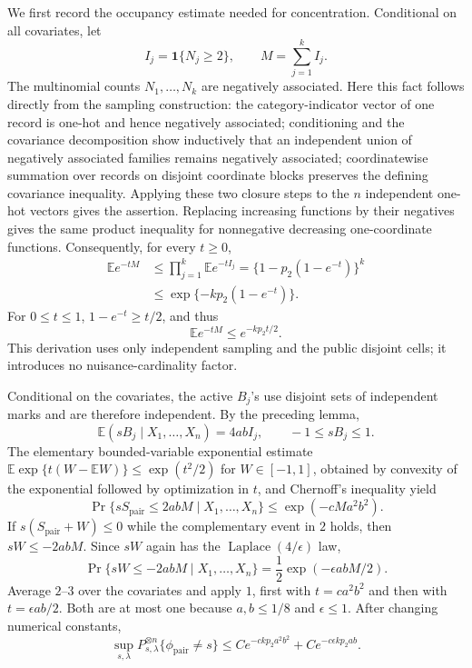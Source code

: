 We first record the occupancy estimate needed for concentration.  Conditional on all covariates, let
\[
 I_j=\mathbf1\{N_j\ge2\},
 \qquad M=\sum_{j=1}^k I_j.
\]
The multinomial counts \(N_1,\ldots,N_k\) are negatively associated.  Here this fact follows directly from the sampling construction: the category-indicator vector of one record is one-hot and hence negatively associated; conditioning and the covariance decomposition show inductively that an independent union of negatively associated families remains negatively associated; coordinatewise summation over records on disjoint coordinate blocks preserves the defining covariance inequality.  Applying these two closure steps to the \(n\) independent one-hot vectors gives the assertion.  Replacing increasing functions by their negatives gives the same product inequality for nonnegative decreasing one-coordinate functions.  Consequently, for every \(t\ge0\),
\[
 \begin{aligned}
 \mathbb E e^{-tM}
 &\le\prod_{j=1}^k\mathbb E e^{-tI_j}
   =\{1-p_2(1-e^{-t})\}^k\\
 &\le\exp\{-kp_2(1-e^{-t})\}.
 \end{aligned}
\]
For \(0\le t\le1\), \(1-e^{-t}\ge t/2\), and thus
\[
 \mathbb E e^{-tM}\le e^{-kp_2t/2}. \tag{1}
\]
This derivation uses only independent sampling and the public disjoint cells; it introduces no nuisance-cardinality factor.

Conditional on the covariates, the active \(B_j\)'s use disjoint sets of independent marks and are therefore independent.  By the preceding lemma,
\[
 \mathbb E(sB_j\mid X_1,\ldots,X_n)=4abI_j,
 \qquad -1\le sB_j\le1.
\]
The elementary bounded-variable exponential estimate
\(\mathbb E\exp\{t(W-\mathbb EW)\}\le\exp(t^2/2)\) for \(W\in[-1,1]\), obtained by convexity of the exponential followed by optimization in \(t\), and Chernoff's inequality yield
\[
 \Pr\{sS_{\mathrm{pair}}\le2abM\mid X_1,\ldots,X_n\}
 \le \exp(-cMa^2b^2). \tag{2}
\]
If \(s(S_{\mathrm{pair}}+W)\le0\) while the complementary event in \(2\) holds, then \(sW\le-2abM\).  Since \(sW\) again has the \(\operatorname{Laplace}(4/\epsilon)\) law,
\[
 \Pr\{sW\le-2abM\mid X_1,\ldots,X_n\}
 =\frac12\exp(-\epsilon abM/2). \tag{3}
\]
Average \(2\)--\(3\) over the covariates and apply \(1\), first with \(t=ca^2b^2\) and then with \(t=\epsilon ab/2\).  Both are at most one because \(a,b\le1/8\) and \(\epsilon\le1\).  After changing numerical constants,
\[
 \sup_{s,\lambda}P_{s,\lambda}^{\otimes n}
 \{\phi_{\mathrm{pair}}\ne s\}
 \le C e^{-ckp_2a^2b^2}
      +C e^{-c\epsilon kp_2ab}. \tag{4}
\]

